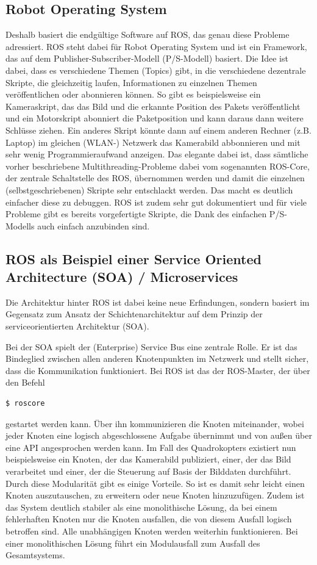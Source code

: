 \subsection{Robot Operating System}
Deshalb basiert die endgültige Software auf ROS, das genau diese Probleme adressiert. ROS steht dabei für Robot Operating System und ist ein Framework, das auf dem Publisher-Subscriber-Modell (P/S-Modell) basiert. Die Idee ist dabei, dass es verschiedene Themen (Topics) gibt, in die verschiedene dezentrale Skripte, die gleichzeitig laufen, Informationen zu einzelnen Themen veröffentlichen oder abonnieren können. So gibt es beispielsweise ein Kameraskript, das das Bild und die erkannte Position des Pakets veröffentlicht und ein Motorskript abonniert die Paketposition und kann daraus dann weitere Schlüsse ziehen. Ein anderes Skript könnte dann auf einem anderen Rechner (z.B. Laptop) im gleichen (WLAN-) Netzwerk das Kamerabild abbonnieren und mit sehr wenig Programmieraufwand anzeigen. Das elegante dabei ist, dass sämtliche vorher beschriebene Multithreading-Probleme dabei vom sogenannten ROS-Core, der zentrale Schaltstelle des ROS, übernommen werden und damit die einzelnen (selbstgeschriebenen) Skripte sehr entschlackt werden. Das macht es deutlich einfacher diese zu debuggen. ROS ist zudem sehr gut dokumentiert und für viele Probleme gibt es bereits vorgefertigte Skripte, die Dank des einfachen P/S-Modells auch einfach anzubinden sind.
\subsection{ROS als Beispiel einer Service Oriented Architecture (SOA) / Microservices}
Die Architektur hinter ROS ist dabei keine neue Erfindungen, sondern basiert im Gegensatz zum Ansatz der Schichtenarchitektur auf dem Prinzip der serviceorientierten Architektur (SOA). 

Bei der SOA spielt der (Enterprise) Service Bus eine zentrale Rolle. Er ist das Bindeglied zwischen allen anderen Knotenpunkten im Netzwerk und stellt sicher, dass die Kommunikation funktioniert. Bei ROS ist das der ROS-Master, der über den Befehl 
\begin{lstlisting}[language=bash]
$ roscore
\end{lstlisting}
gestartet werden kann. Über ihn kommunizieren die Knoten miteinander, wobei jeder Knoten eine logisch abgeschlossene Aufgabe übernimmt und von außen über eine API angesprochen werden kann. Im Fall des Quadrokopters existiert nun beispielsweise ein Knoten, der das Kamerabild publiziert, einer, der das Bild verarbeitet und einer, der die Steuerung auf Basis der Bilddaten durchführt. Durch diese Modularität gibt es einige Vorteile. So ist es damit sehr leicht einen Knoten auszutauschen, zu erweitern oder neue Knoten hinzuzufügen. Zudem ist das System deutlich stabiler als eine monolithische Lösung, da bei einem fehlerhaften Knoten nur die Knoten ausfallen, die von diesem Ausfall logisch betroffen sind. Alle unabhängigen Knoten werden weiterhin funktionieren. Bei einer monolithischen Lösung führt ein Modulausfall zum Ausfall des Gesamtsystems. 

